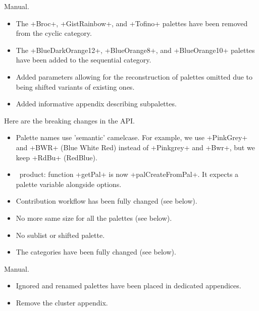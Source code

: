 \documentclass{tutodoc}
\begin{document}


\begin{tdocupdate}
    \item Manual.
    \begin{itemize}
        \item The +Broc+, +GistRainbow+, and +Tofino+ palettes have been removed from the cyclic category.


        \item The +BlueDarkOrange12+, +BlueOrange8+, and +BlueOrange10+ palettes have been added to the sequential category.


        \item Added parameters allowing for the reconstruction of palettes omitted due to being shifted variants of existing ones.


        \item Added informative appendix describing subpalettes.
    \end{itemize}
\end{tdocupdate}

\tdocsep

\begin{tdocbreak}[version = 2.0.0, date = 2026-02-28]
    \item Here are the breaking changes in the API.
    \begin{itemize}
        \item Palette names use 'semantic' camelcase. For example, we use +PinkGrey+ and +BWR+ (Blue White Red) instead of +Pinkgrey+ and +Bwr+, but we keep +RdBu+ (RedBlue).


        \item \lua\ product: function +getPal+ is now +palCreateFromPal+. It expects a palette variable alongside options.


        \item Contribution workflow has been fully changed (see below).


        \item No more same size for all the palettes (see below).


        \item No sublist or shifted palette.


        \item The categories have been fully changed (see below).
    \end{itemize}


    \item Manual.
    \begin{itemize}
        \item Ignored and renamed palettes have been placed in dedicated appendices.

        \item Remove the cluster appendix.
    \end{itemize}
\end{tdocbreak}
\end{document}
